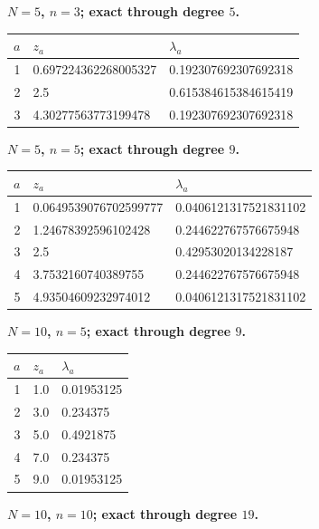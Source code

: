 \par\medskip\noindent\textbf{$N=5$, $n=3$; exact through degree $5$.}
\begin{center}\small
\begin{tabular}{rll}
$a$ & $z_a$ & $\lambda_a$\\\hline
1 & 0.697224362268005327 & 0.192307692307692318\\
2 & 2.5 & 0.615384615384615419\\
3 & 4.30277563773199478 & 0.192307692307692318\\
\end{tabular}
\end{center}
\par\medskip\noindent\textbf{$N=5$, $n=5$; exact through degree $9$.}
\begin{center}\small
\begin{tabular}{rll}
$a$ & $z_a$ & $\lambda_a$\\\hline
1 & 0.0649539076702599777 & 0.0406121317521831102\\
2 & 1.24678392596102428 & 0.244622767576675948\\
3 & 2.5 & 0.42953020134228187\\
4 & 3.7532160740389755 & 0.244622767576675948\\
5 & 4.93504609232974012 & 0.0406121317521831102\\
\end{tabular}
\end{center}
\par\medskip\noindent\textbf{$N=10$, $n=5$; exact through degree $9$.}
\begin{center}\small
\begin{tabular}{rll}
$a$ & $z_a$ & $\lambda_a$\\\hline
1 & 1.0 & 0.01953125\\
2 & 3.0 & 0.234375\\
3 & 5.0 & 0.4921875\\
4 & 7.0 & 0.234375\\
5 & 9.0 & 0.01953125\\
\end{tabular}
\end{center}
\par\medskip\noindent\textbf{$N=10$, $n=10$; exact through degree $19$.}
